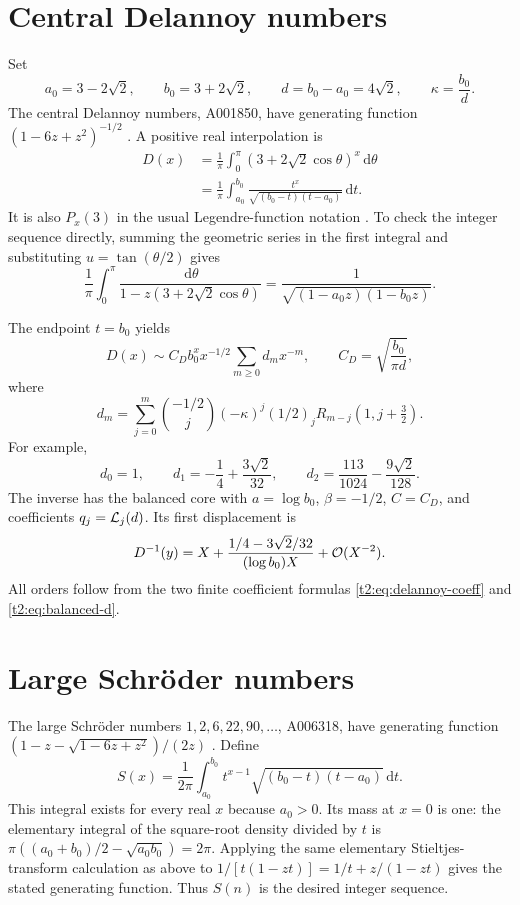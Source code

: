 \documentclass[11pt,openany]{book}
\numberwithin{equation}{chapter}
\theoremstyle{plain}
\theoremstyle{definition}
\theoremstyle{remark}
\newcommand{\dd}{\,\mathrm d}                 %
\newcommand{\rising}[2]{(#1)_{#2}}
\begin{document}
\section{Central Delannoy numbers}

Set
\begin{equation}
 a_0=3-2\sqrt2,\qquad b_0=3+2\sqrt2,\qquad
 d=b_0-a_0=4\sqrt2,\qquad \kappa=\frac{b_0}{d}.
 \label{t2:eq:DS-constants}
\end{equation}
The central Delannoy numbers, A001850, have generating function
$(1-6z+z^2)^{-1/2}$ \cite{oeisdelannoy}. A positive real interpolation is
\begin{align}
 D(x)&=\frac1\pi\int_0^\pi(3+2\sqrt2\cos\theta)^x\dd\theta\nonumber\\
 &=\frac1\pi\int_{a_0}^{b_0}
           \frac{t^x}{\sqrt{(b_0-t)(t-a_0)}}\dd t.
 \label{t2:eq:delannoy-moment}
\end{align}
It is also $P_x(3)$ in the usual Legendre-function notation \cite{dlmflegendre}. To check the integer sequence directly, summing the geometric series in the first integral and substituting $u=\tan(\theta/2)$ gives
\[
 \frac1\pi\int_0^\pi\frac{\dd\theta}{1-z(3+2\sqrt2\cos\theta)}
 =\frac1{\sqrt{(1-a_0z)(1-b_0z)}}.
\]

The endpoint $t=b_0$ yields
\begin{equation}
 D(x)\sim C_D b_0^x x^{-1/2}\sum_{m\ge0}d_mx^{-m},
 \qquad C_D=\sqrt{\frac{b_0}{\pi d}},
 \label{t2:eq:delannoy-asymp}
\end{equation}
where
\begin{equation}
 d_m=\sum_{j=0}^m\binom{-1/2}{j}(-\kappa)^j
             \rising{1/2}{j}R_{m-j}(1,j+\tfrac32).
 \label{t2:eq:delannoy-coeff}
\end{equation}
For example,
\[
 d_0=1,\qquad d_1=-\frac14+\frac{3\sqrt2}{32},\qquad
 d_2=\frac{113}{1024}-\frac{9\sqrt2}{128}.
\]
The inverse has the balanced core with $a=\log b_0$, $\beta=-1/2$, $C=C_D$, and coefficients $q_j=\mathcal L_j(d)$. Its first displacement is
\[
 D^{-1}(y)=X+\frac{1/4-3\sqrt2/32}{(\log b_0)X}+\mathcal O(X^{-2}).
\]
All orders follow from the two finite coefficient formulas \eqref{t2:eq:delannoy-coeff} and \eqref{t2:eq:balanced-d}.

\section{Large Schr\"oder numbers}

The large Schr\"oder numbers $1,2,6,22,90,\ldots$, A006318, have generating function
$(1-z-\sqrt{1-6z+z^2})/(2z)$ \cite{oeisschroder}. Define
\begin{equation}
 S(x)=\frac1{2\pi}\int_{a_0}^{b_0}
                t^{x-1}\sqrt{(b_0-t)(t-a_0)}\dd t.
 \label{t2:eq:schroder-moment}
\end{equation}
This integral exists for every real $x$ because $a_0>0$. Its mass at $x=0$ is one: the elementary integral of the square-root density divided by $t$ is
$\pi((a_0+b_0)/2-\sqrt{a_0b_0})=2\pi$. Applying the same elementary Stieltjes-transform calculation as above to
$1/[t(1-zt)]=1/t+z/(1-zt)$ gives the stated generating function. Thus $S(n)$ is the desired integer sequence.
\end{document}
